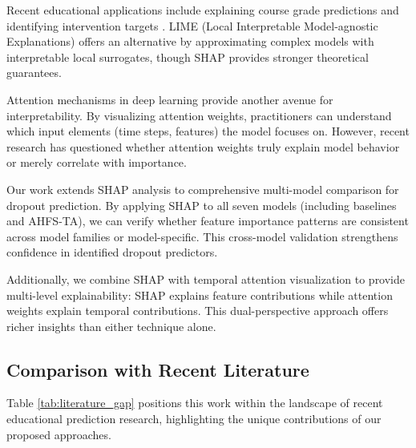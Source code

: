 \documentclass[journal]{IEEEtran}
\begin{document}
Recent educational applications include explaining course grade predictions \cite{swamy2022explainable} and identifying intervention targets \cite{khosravi2022explainable}. LIME (Local Interpretable Model-agnostic Explanations) offers an alternative by approximating complex models with interpretable local surrogates, though SHAP provides stronger theoretical guarantees.

Attention mechanisms in deep learning provide another avenue for interpretability. By visualizing attention weights, practitioners can understand which input elements (time steps, features) the model focuses on. However, recent research has questioned whether attention weights truly explain model behavior or merely correlate with importance.

Our work extends SHAP analysis to comprehensive multi-model comparison for dropout prediction. By applying SHAP to all seven models (including baselines and AHFS-TA), we can verify whether feature importance patterns are consistent across model families or model-specific. This cross-model validation strengthens confidence in identified dropout predictors.

Additionally, we combine SHAP with temporal attention visualization to provide multi-level explainability: SHAP explains feature contributions while attention weights explain temporal contributions. This dual-perspective approach offers richer insights than either technique alone.

\subsection{Comparison with Recent Literature}

Table \ref{tab:literature_gap} positions this work within the landscape of recent educational prediction research, highlighting the unique contributions of our proposed approaches.
\end{document}
